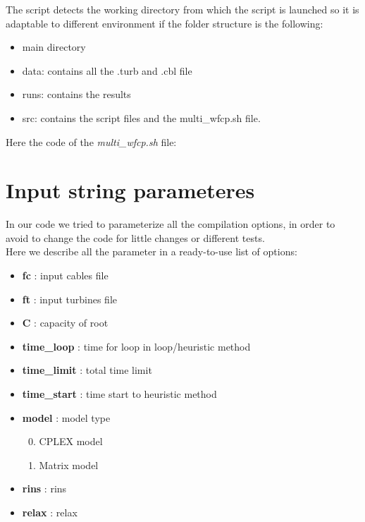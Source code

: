 \begin{appendices}
The script detects the working directory from which the script is launched so it is adaptable to different environment if the folder structure is the following:
\begin{itemize}
\item main directory
\item data: contains all the .turb and .cbl file
\item runs: contains the results 
\item src: contains the script files and the multi\_wfcp.sh file. 
\end{itemize}

Here the code of the \textit{multi\_wfcp.sh} file:
\newpage


\chapter{Input string parameteres}
In our code we tried to parameterize all the compilation options, in order to avoid to change the code for little changes or different tests. \\
Here we describe all the parameter in a ready-to-use list of options: 
\begin{itemize}
\setlength{\parskip}{0pt}
\setlength{\itemsep}{0.5pt plus 1pt}
\item \textbf{fc} : input cables file
\item \textbf{ft} : input turbines file
\item \textbf{C} : capacity of root
\item \textbf{time\_loop} : time for loop in loop/heuristic method
\item \textbf{time\_limit} : total time limit
\item \textbf{time\_start} : time start to heuristic method
\item \textbf{model} : model type
\begin{enumerate}\setcounter{enumi}{-1}
\setlength{\parskip}{0pt}
\setlength{\itemsep}{0pt plus 1pt}
	\item \textsc{CPLEX} model
	\item Matrix model
\end{enumerate}
\item \textbf{rins} : rins
\item \textbf{relax} : relax
\begin{enumerate}\setcounter{enumi}{0}
\setlength{\parskip}{0pt}
\setlength{\itemsep}{0pt plus 1pt}

\end{enumerate}
\end{itemize}
\end{appendices}
